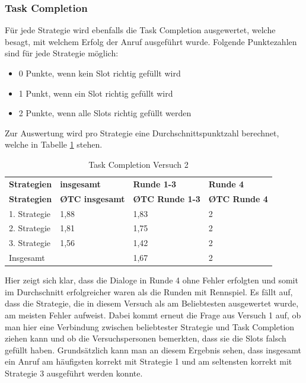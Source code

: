 \documentclass[12pt,a4paper]{scrartcl}
\begin{document}
\subsubsection{Task Completion}
\label{TC2}
Für jede Strategie wird ebenfalls die Task Completion ausgewertet, welche besagt, mit welchem Erfolg der Anruf ausgeführt wurde. Folgende Punktezahlen sind für jede Strategie möglich:
\begin{itemize}
\item 0 Punkte, wenn kein Slot richtig gefüllt wird
\item 1 Punkt, wenn ein Slot richtig gefüllt wird
\item 2 Punkte, wenn alle Slots richtig gefüllt werden
\end{itemize}
Zur Auswertung wird pro Strategie eine Durchschnittspunktzahl berechnet, welche in Tabelle \ref{TCV2} stehen. 

\begin{longtable}{p{3cm}p{3cm}p{3cm}p{3cm} }
	\label{TCV2}\\
	\caption[Task Completion Versuch 2]{Task Completion Versuch 2}\\
	\hline
\textbf{Strategien}&\textbf{insgesamt}&\textbf{Runde 1-3} &\textbf{Runde 4}\\
	\hline
	\endfirsthead
	\hline
	\textbf{Strategien}&\textbf{\O TC insgesamt}&\textbf{\O TC Runde 1-3} &\textbf{\O TC Runde 4}\\
	\hline
	\endhead
1. Strategie & 1,88 & 1,83 & 2  \\
2. Strategie & 1,81 & 1,75 & 2  \\
3. Strategie & 1,56 & 1,42 & 2  \\
\hline
Insgesamt & & 1,67 & 2 \\ 
\hline
\end{longtable}

Hier zeigt sich klar, dass die Dialoge in Runde 4 ohne Fehler erfolgten und somit im Durchschnitt erfolgreicher waren als die Runden mit Rennspiel. Es fällt auf, dass die Strategie, die in diesem Versuch als am Beliebtesten ausgewertet wurde, am meisten Fehler aufweist. Dabei kommt erneut die Frage aus Versuch 1 auf, ob man hier eine Verbindung zwischen beliebtester Strategie und Task Completion ziehen kann und ob die Versuchspersonen bemerkten, dass sie die Slots falsch gefüllt haben. 
Grundsätzlich kann man an diesem Ergebnis sehen, dass insgesamt ein Anruf am häufigsten korrekt mit Strategie 1 und am seltensten korrekt mit Strategie 3 ausgeführt werden konnte. 
\end{document}
